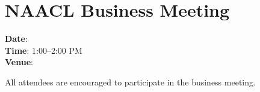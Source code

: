 \section[NAACL Business Meeting]{NAACL Business Meeting}
\thispagestyle{emptyheader}

\textbf{Date}: \daydateyear \\
\textbf{Time}: 1:00--2:00 PM \\
\textbf{Venue}: \BusinessMeetingLoc


All attendees are encouraged to participate in the business
meeting. 

